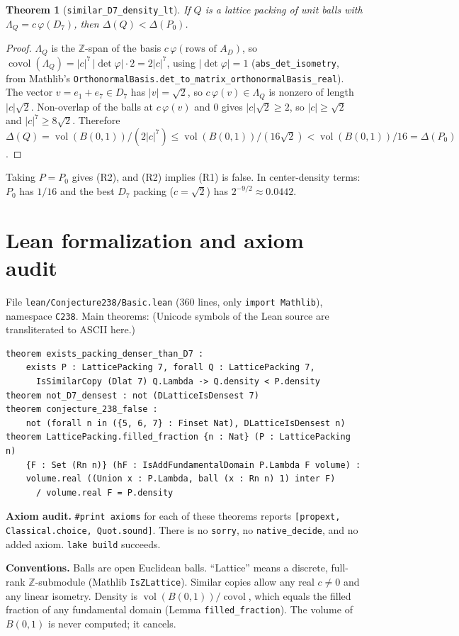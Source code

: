 \documentclass[11pt]{article}
\newtheorem{theorem}{Theorem}
\theoremstyle{definition}
\theoremstyle{remark}
\newcommand{\Z}{\mathbb{Z}}
\newcommand{\covol}{\operatorname{covol}}
\newcommand{\vol}{\operatorname{vol}}
\begin{document}
\begin{theorem}[\texttt{similar\_D7\_density\_lt}]
If $Q$ is a lattice packing of unit balls with $\Lambda_Q=c\,\varphi(D_7)$, then
$\Delta(Q)<\Delta(P_0)$.
\end{theorem}
\begin{proof}
$\Lambda_Q$ is the $\Z$-span of the basis $c\,\varphi(\text{rows of }A_D)$, so
$\covol(\Lambda_Q)=|c|^7\,|\det\varphi|\cdot 2=2|c|^7$, using $|\det\varphi|=1$
(\texttt{abs\_det\_isometry}, from Mathlib's
\texttt{OrthonormalBasis.det\_to\_matrix\_orthonormalBasis\_real}). The vector $v=e_1+e_7\in D_7$
has $|v|=\sqrt2$, so $c\,\varphi(v)\in\Lambda_Q$ is nonzero of length $|c|\sqrt2$. Non-overlap of
the balls at $c\,\varphi(v)$ and $0$ gives $|c|\sqrt2\ge2$, so $|c|\ge\sqrt2$ and
$|c|^7\ge 8\sqrt2$. Therefore $\Delta(Q)=\vol(B(0,1))/(2|c|^7)\le\vol(B(0,1))/(16\sqrt2)
<\vol(B(0,1))/16=\Delta(P_0)$.
\end{proof}

Taking $P=P_0$ gives (R2), and (R2) implies (R1) is false. In center-density terms: $P_0$ has
$1/16$ and the best $D_7$ packing ($c=\sqrt2$) has $2^{-9/2}\approx 0.0442$.

\section{Lean formalization and axiom audit}

File \texttt{lean/Conjecture238/Basic.lean} (360 lines, only \texttt{import Mathlib}), namespace
\texttt{C238}. Main theorems:
(Unicode symbols of the Lean source are transliterated to ASCII here.)
\begin{verbatim}
theorem exists_packing_denser_than_D7 :
    exists P : LatticePacking 7, forall Q : LatticePacking 7,
      IsSimilarCopy (Dlat 7) Q.Lambda -> Q.density < P.density
theorem not_D7_densest : not (DLatticeIsDensest 7)
theorem conjecture_238_false :
    not (forall n in ({5, 6, 7} : Finset Nat), DLatticeIsDensest n)
theorem LatticePacking.filled_fraction {n : Nat} (P : LatticePacking n)
    {F : Set (Rn n)} (hF : IsAddFundamentalDomain P.Lambda F volume) :
    volume.real ((Union x : P.Lambda, ball (x : Rn n) 1) inter F)
      / volume.real F = P.density
\end{verbatim}
\textbf{Axiom audit.} \texttt{\#print axioms} for each of these theorems reports
\texttt{[propext, Classical.choice, Quot.sound]}. There is no \texttt{sorry}, no
\texttt{native\_decide}, and no added axiom. \texttt{lake build} succeeds.

\textbf{Conventions.} Balls are open Euclidean balls. ``Lattice'' means a discrete, full-rank
$\Z$-submodule (Mathlib \texttt{IsZLattice}). Similar copies allow any real $c\neq0$ and any linear
isometry. Density is $\vol(B(0,1))/\covol$, which equals the filled fraction of any fundamental
domain (Lemma \texttt{filled\_fraction}). The volume of $B(0,1)$ is never computed; it cancels.
\end{document}
